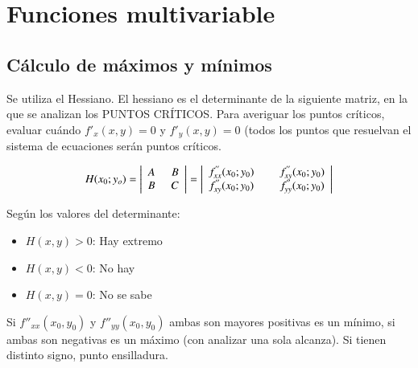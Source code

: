 \section{Funciones multivariable}

\subsection*{Cálculo de máximos y mínimos}

Se utiliza el Hessiano. El hessiano es el determinante de la siguiente matriz, en la que se analizan los PUNTOS CRÍTICOS. Para averiguar los puntos críticos, evaluar cuándo $f'_{x}(x,y) = 0$ y $f'_{y}(x,y)=0$ (todos los puntos que resuelvan el sistema de ecuaciones serán puntos críticos.

{
\Large
\renewcommand{\arraystretch}{1.4}
\[
H(x_0;y_o) =
\left|
\begin{array}{c@{\hspace{5mm}}c}
A & B\\
B & C\\
\end{array}
\right|
=
\left|
\begin{array}{c@{\hspace{8mm}}c}
f_{xx}^{''}(x_0;y_0) & f_{xy}^{''}(x_0;y_0)\\
f_{xy}^{''}(x_0; y_0) & f_{yy}^{''}(x_0; y_0)\\
\end{array}\right|
\]
}

Según los valores del determinante:
\begin{itemize}
\item $H(x,y) > 0$: Hay extremo
\item $H(x,y) < 0$: No hay
\item $H(x,y) = 0$: No se sabe
\end{itemize}

Si $f''_{xx}(x_0,y_0)$ y $f''_{yy}(x_0,y_0)$ ambas son mayores positivas es un mínimo, si ambas son negativas es un máximo (con analizar una sola alcanza). Si tienen distinto signo, punto ensilladura.